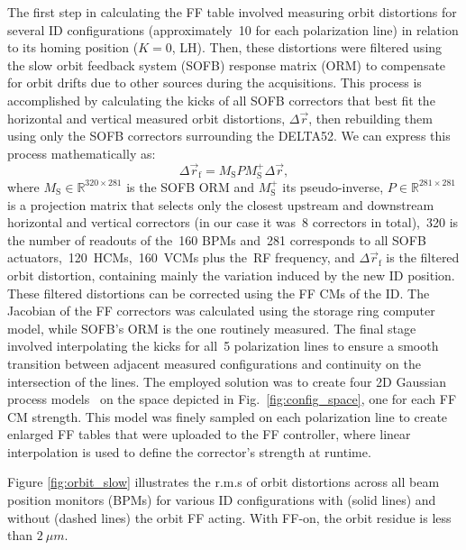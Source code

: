 \documentclass[a4paper,
               keeplastbox,   %
               ]{jacow}
\begin{document}
The first step in calculating the FF table involved measuring orbit distortions for several ID configurations (approximately~\num{10} for each polarization line) in relation to its homing position ($K=0$, LH). Then, these distortions were filtered using the slow orbit feedback system (SOFB) response matrix (ORM) to compensate for orbit drifts due to other sources during the acquisitions. This process is accomplished by calculating the kicks of all SOFB correctors that best fit the horizontal and vertical measured orbit distortions, $\Delta\vec{r}$, then rebuilding them using only the SOFB correctors surrounding the DELTA52. We can express this process mathematically as:
\begin{equation}
    \Delta\vec{r}_\mathrm{f} = M_\text{S} P M_\text{S}^+\Delta\vec{r},
\end{equation}
where $M_\text{S} \in \mathbb{R}^{320\times281}$ is the SOFB ORM and $M_\text{S}^+$ its pseudo-inverse, $P \in \mathbb{R}^{281\times281}$ is a projection matrix that selects only the closest upstream and downstream horizontal and vertical correctors (in our case it was~\num{8} correctors in total),~\num{320} is the number of readouts of the~\num{160} BPMs and~\num{281} corresponds to all SOFB actuators,~\num{120}~HCMs,~\num{160}~VCMs plus the~RF frequency, and $\Delta\vec{r}_\mathrm{f}$ is the filtered orbit distortion, containing mainly the variation induced by the new ID position. These filtered distortions can be corrected using the FF CMs of the ID. The Jacobian of the FF correctors was calculated using the storage ring computer model, while  SOFB's ORM is the one routinely measured. The final stage involved interpolating the kicks for all~\num{5} polarization lines to ensure a smooth transition between adjacent measured configurations and continuity on the intersection of the lines. The employed solution was to create four 2D Gaussian process models~\cite{Gaussian} on the space depicted in Fig.~\ref{fig:config_space}, one for each FF CM strength. This model was finely sampled on each polarization line to create enlarged FF tables that were uploaded to the FF controller, where linear interpolation is used to define the corrector's strength at runtime.

Figure \ref{fig:orbit_slow} illustrates the r.m.s of orbit distortions across all beam position monitors (BPMs) for various ID configurations with (solid lines) and without (dashed lines) the orbit FF acting. With FF-on,  the orbit residue is less than $\SI{2}{\mu m}$.%
\end{document}
